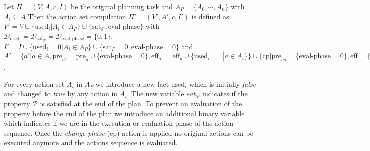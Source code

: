 \begin{definition}
	Let $\Pi = (V, A, c, I)$ be the original planning task and $A_P=\{A_0, \cdots, A_n\}$ 
	with $A_i \subseteq A$ 
	Then the action set compilation $\Pi' = (V', A', c, I')$ is defined as: 
	$V' = V \cup \{\text{used}_i | A_i \in A_P\} \cup \{\text{sat}_{\mathcal{P}}, \text{eval-phase}\}$ 
	with $\mathcal{D}_{\text{used}_i} = \mathcal{D}_{\text{sat}_{\mathcal{P}}} = \mathcal{D}_{\text{eval-phase}} = \{0,1\}$, 
	$I' = I \cup \{\text{used}_i = 0 | A_i \in A_P\} \cup \{\text{sat}_{P} = 0, \text{eval-phase} = 0\}$ 
	and $A' = \{ a' | a \in A, 
	\text{pre}_{a'} = \text{pre}_{a} \cup \{\text{eval-phase} = 0\} , \text{eff}_{a'} = \text{eff}_a \cup \{\text{used}_i = 1 | a \in A_i\}\} \cup 
	\{\text{cp} | \text{pre}_{cp} = \{\text{eval-phase} = 0\}, \text{eff} = \{\text{eval-phase} = 1 \}\} \cup 
	\{\text{actions to eval } \mathcal{P}\}$. 
\end{definition}

For every action set $A_i$ in $A_P$ we introduce a new fact $\text{used}_i$ which is initially 
\emph{false} and changed to \emph{true} by any action in $A_i$. The new variable $sat_{\mathcal{P}}$ indicates 
if the property $\mathcal{P}$ is satisfied at the end of the plan. To prevent an 
evaluation of the property before the end of the plan we introduce an additional binary variable
which indicates if we are in the execution or evaluation phase of the action sequence. Once the \textit{change-phase} (cp) action
is applied no original actions can be executed anymore and the actions sequence is evaluated.


